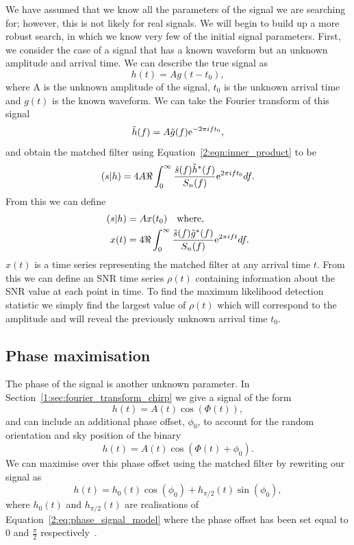 We have assumed that we know all the parameters of the signal we are searching for; however, this is not likely for real \gwadj signals. We will begin to build up a more robust search, in which we know very few of the initial \gwadj signal parameters. First, we consider the case of a signal that has a known waveform but an unknown amplitude and arrival time. We can describe the true signal as
%
\begin{equation}
    h(t) = A g(t - t_{0}),
\end{equation}
%
where A is the unknown amplitude of the signal, $t_{0}$ is the unknown arrival time and $g(t)$ is the known waveform. We can take the Fourier transform of this signal
%
\begin{equation}
    \tilde{h}(f) = A \tilde{g}(f) {\rm e}^{-2\pi i f t_{0}},
\end{equation}
%
and obtain the matched filter using Equation~\ref{2:eqn:inner_product} to be
%
\begin{equation}
    (s|h) = 4 A \Re \int^{\infty}_{0} \frac{\tilde{s}(f) \tilde{h}^*(f)}{S_n(f)} {\rm e}^{2\pi i f t_{0}} df.
\end{equation}
%
From this we can define
%
\begin{align}
    (s|h) &= A x(t_{0}) \quad \text{where}, \\
    x(t) &= 4 \Re \int^{\infty}_{0} \frac{\tilde{s}(f) \tilde{g}^*(f)}{S_n(f)} {\rm e}^{2\pi i f t} df.
\end{align}
%
$x(t)$ is a time series representing the matched filter at any arrival time $t$. From this we can define an SNR time series $\rho(t)$ containing information about the SNR value at each point in time. To find the maximum likelihood detection statistic we simply find the largest value of $\rho(t)$ which will correspond to the amplitude and will reveal the previously unknown arrival time $t_{0}$.

\subsection{\label{2:sec:phase-maximisation}Phase maximisation}

The phase of the \gwadj signal is another unknown parameter. In Section~\ref{1:sec:fourier_transform_chirp} we give a signal of the form
%
\begin{equation}
    h(t) = A(t) \cos\left(\Phi(t)\right),
\end{equation}
%
and can include an additional phase offset, $\phi_{0}$, to account for the random orientation and sky position of the binary
%
\begin{equation}
    h(t) = A(t) \cos\left(\Phi(t) + \phi_{0}\right).
    \label{2:eq:phase_signal_model}
\end{equation}
%
We can maximise over this phase offset using the matched filter by rewriting our signal as
%
\begin{equation}
    h(t) = h_{0}(t) \cos(\phi_{0}) + h_{\pi/2}(t)\sin(\phi_{0}),
\end{equation}
%
where $h_{0}(t)$ and $h_{\pi/2}(t)$ are realisations of Equation~\ref{2:eq:phase_signal_model} where the phase offset has been set equal to $0$ and $\frac{\pi}{2}$ respectively~\cite{IHOPE:2012zx}.

